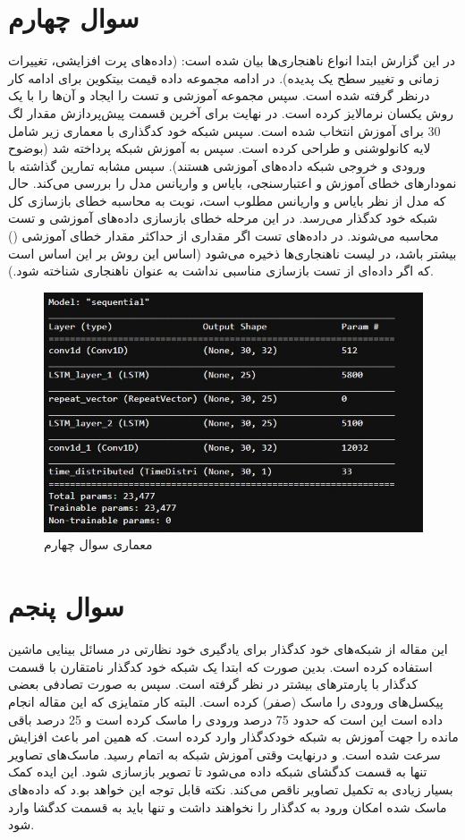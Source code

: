 \documentclass{article}
\begin{document}
\section{سوال چهارم}
در این گزارش ابتدا انواع ناهنجاری‌ها بیان شده است: (داده‌های پرت افزایشی، تغییرات زمانی و تغییر سطح یک پدیده). در ادامه مجموعه داده قیمت بیتکوین برای ادامه کار درنظر گرفته شده است. سپس مجموعه آموزشی و تست را ایجاد و آن‌ها را با یک روش یکسان نرمالایز کرده است. در نهایت برای آخرین قسمت پیش‌پردازش مقدار لگ 30 برای آموزش انتخاب شده است. سپس شبکه خود کدگذاری با معماری زیر شامل لایه کانولوشنی و  طراحی کرده است. سپس به آموزش شبکه پرداخته شد (بوضوح ورودی و خروجی شبکه داده‌های آموزشی هستند). سپس مشابه تمارین گذاشته با نمودارهای خطای آموزش و اعتبارسنجی، بایاس و واریانس مدل را بررسی می‌کند. حال که مدل از نظر بایاس و واریانس مطلوب است، نوبت به محاسبه خطای بازسازی کل شبکه خود کدگذار می‌رسد. در این مرحله خطای بازسازی داده‌های آموزشی و تست محاسبه می‌شوند. در داده‌های تست اگر مقداری از حداکثر مقدار خطای آموزشی () بیشتر باشد، در لیست ناهنجاری‌ها ذخیره می‌شود (اساس این روش بر این اساس است که اگر داده‌ای از تست بازسازی مناسبی نداشت به عنوان ناهنجاری شناخته شود.).

\begin{figure}[!h]
    \centering\includegraphics[scale=.55]{./p4-1}
    \caption{معماری سوال چهارم}\label{fig.41}
\end{figure}

\section{سوال پنجم}
این مقاله از شبکه‌های خود کدگذار برای یادگیری خود نظارتی در مسائل بینایی ماشین استفاده کرده است. بدین صورت که ابتدا یک شبکه‌ خود کدگذار نامتقارن با قسمت کدگذار با پارمترهای بیشتر در نظر گرفته است. سپس به صورت تصادفی بعضی پیکسل‌های ورودی را ماسک (صفر) کرده است. البته کار متمایزی که این مقاله انجام داده است این است که حدود 75 درصد ورودی را ماسک کرده است و 25 درصد باقی مانده را جهت آموزش به شبکه خودکدگذار وارد کرده است. که همین امر باعث افزایش سرعت شده است. و درنهایت وقتی آموزش شبکه به اتمام رسید. ماسک‌های تصاویر تنها به قسمت کدگشای شبکه داده می‌شود تا تصویر بازسازی شود. این ایده کمک بسیار زیادی به تکمیل تصاویر ناقص می‌کند. نکته قابل توجه این خواهد بو.د که داده‌های ماسک شده امکان ورود به کدگذار را نخواهند داشت و تنها باید به قسمت کدگشا وارد شود.

\end{document}
